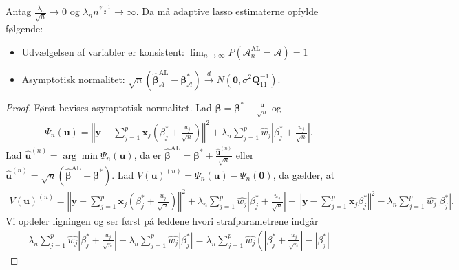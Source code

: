 \citep{adaptive}
\begin{thm}\label{thm:ALoracle}
Antag $\frac{\lambda_n}{\sqrt{n}} \rightarrow 0$ og $\lambda_n n^\frac{\gamma-1}{2} \rightarrow \infty$. Da må adaptive lasso estimaterne opfylde følgende:
\begin{itemize}
\item Udvælgelsen af variabler er konsistent: $\lim_{n \rightarrow \infty} P(\mathcal{A}_n^\text{AL}=\mathcal{A})=1$
\item Asymptotisk normalitet: $\sqrt{n}\left( \hat{\boldsymbol{\beta}}_\mathcal{A}^{\text{AL}}-\boldsymbol{\beta}_\mathcal{A}^* \right) \overset{d}{\rightarrow} N(\textbf{0},\sigma^2 \boldsymbol{Q}_{11}^{-1}).$
\end{itemize} 
\end{thm}
\begin{proof}
Først bevises asymptotisk normalitet. Lad $\boldsymbol{\beta}=\boldsymbol{\beta}^{*} +\frac{\textbf{u}}{\sqrt{n}}$ og
\begin{align*}
\Psi_n(\textbf{u})=\left\Vert \mathbf{y}-\sum_{j=1}^p \textbf{x}_j \left( \beta_j^{*} +\frac{u_j}{\sqrt{n}} \right) \right\Vert^2 + \lambda_n \sum_{j=1}^p \hat{w}_j \left\vert \beta_j^{*} + \frac{u_j}{\sqrt{n}} \right\vert.
\end{align*}
Lad $\hat{\textbf{u}}^{(n)}=\arg \min \Psi_n(\textbf{u})$, da er $\hat{\boldsymbol{\beta}}^{{\text{AL}}}=\boldsymbol{\beta}^{*} + \frac{\hat{\boldsymbol{u}}^{(n)}}{\sqrt{n}}$ eller $\hat{\boldsymbol{u}}^{(n)}=\sqrt{n}\left(\hat{\boldsymbol{\beta}}^{\text{AL}}-\boldsymbol{\beta}^{*}\right)$.
Lad $V(\mathbf{u})^{(n)}=\Psi_n(\textbf{u}) - \Psi_n(\textbf{0})$, da gælder, at
\begin{align*}
V(\mathbf{u})^{(n)}= \left\Vert \textbf{y} - \sum_{j=1}^p \textbf{x}_j \left( \beta_j^{*} + \frac{u_j}{\sqrt{n}} \right) \right\Vert^2 +
\lambda_n \sum_{j=1}^p \hat{w_j} \left\vert \beta_j^{*} + \frac{u_j}{\sqrt{n}} \right\vert 
-
\left\Vert \textbf{y} - \sum_{j=1}^p \textbf{x}_j \beta_j^{*} \right\Vert^2 - \lambda_n \sum_{j=1}^p \hat{w_j} \left\vert \beta_j^{*} \right\vert. 
\end{align*}
Vi opdeler ligningen og ser først på leddene hvori strafparametrene indgår
\begin{align*}
\lambda_n \sum_{j=1}^p \hat{w_j} \left\vert \beta_j^{*} + \frac{u_j}{\sqrt{n}} \right\vert- \lambda_n \sum_{j=1}^p \hat{w_j} \left\vert \beta_j^{*} \right\vert 
= \lambda_n \sum_{j=1}^p \hat{w_j} \left( \left\vert \beta_j^{*} + \frac{u_j}{\sqrt{n}} \right\vert - \left\vert \beta_j^{*} \right\vert

\end{align*}
\end{proof}
